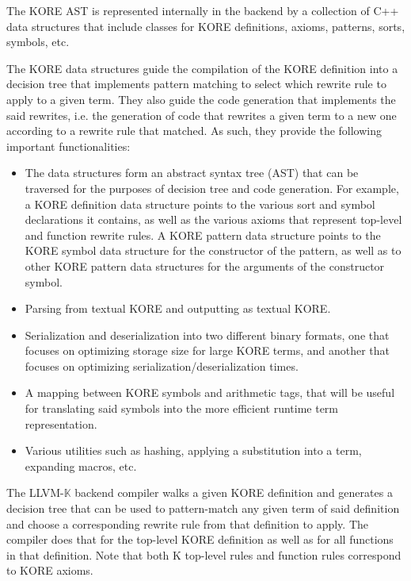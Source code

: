 \documentclass{article}
\theoremstyle{definition}
\newcommand{\K}{$\mathbb{K}$\xspace}
\newcommand{\KL}{LLVM-\K}
\begin{document}
The KORE AST is represented internally in the backend by a collection of C++ data structures that include classes for KORE definitions, axioms, patterns, sorts, symbols, etc.

The KORE data structures guide the compilation of the KORE definition into a decision tree that implements pattern matching to select which rewrite rule to apply to a given term. They also guide the code generation that implements the said rewrites, i.e. the generation of code that rewrites a given term to a new one according to a rewrite rule that matched. As such, they provide the following important functionalities:
\begin{itemize}
    \item The data structures form an abstract syntax tree (AST) that can be traversed for the purposes of decision tree and code generation. For example, a KORE definition data structure points to the various sort and symbol declarations it contains, as well as the various axioms that represent top-level and function rewrite rules. A KORE pattern data structure points to the KORE symbol data structure for the constructor of the pattern, as well as to other KORE pattern data structures for the arguments of the constructor symbol.
    \item Parsing from textual KORE and outputting as textual KORE.
    \item Serialization and deserialization into two different binary formats, one that focuses on optimizing storage size for large KORE terms, and another that focuses on optimizing serialization/deserialization times.
    \item A mapping between KORE symbols and arithmetic tags, that will be useful for translating said symbols into the more efficient runtime term representation.
    \item Various utilities such as hashing, applying a substitution into a term, expanding macros, etc.
\end{itemize}

The \KL backend compiler walks a given KORE definition and generates a decision tree that can be used to pattern-match any given term of said definition and choose a corresponding rewrite rule from that definition to apply. The compiler does that for the top-level KORE definition as well as for all functions in that definition. Note that both K top-level rules and function rules correspond to KORE axioms.
\end{document}
